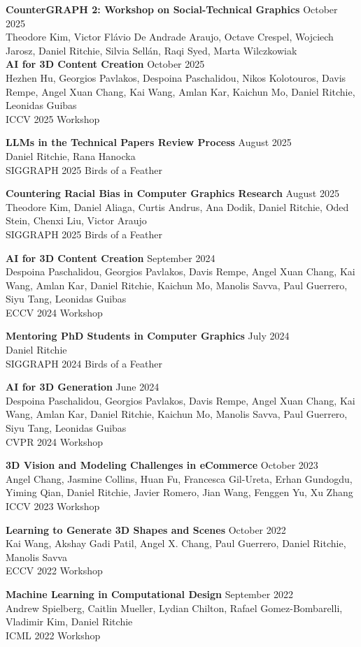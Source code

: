 \documentclass[line,margin]{res}
\begin{document}
\begin{resume}
\newcommand{\tutorial}[4] {
	\textbf{#1} \hfill #4\\
	#2\\
	#3
}
\newcommand{\workshop}[4] {
	\textbf{#1} \hfill #4\\
	#2\\
	#3
}

\workshop
{CounterGRAPH 2: Workshop on Social-Technical Graphics}
{Theodore Kim, Victor Flávio De Andrade Araujo, Octave Crespel, Wojciech Jarosz, Daniel Ritchie, Silvia Sellán, Raqi Syed, Marta Wilczkowiak}
{}
{October 2025}

\workshop
{AI for 3D Content Creation}
{Hezhen Hu, Georgios Pavlakos, Despoina Paschalidou, Nikos Kolotouros, Davis Rempe, Angel Xuan Chang, Kai Wang, Amlan Kar, Kaichun Mo, Daniel Ritchie, Leonidas Guibas}
{ICCV 2025 Workshop}
{October 2025}

\workshop
{LLMs in the Technical Papers Review Process}
{Daniel Ritchie, Rana Hanocka}
{SIGGRAPH 2025 Birds of a Feather}
{August 2025}

\workshop
{Countering Racial Bias in Computer Graphics Research}
{Theodore Kim, Daniel Aliaga, Curtis Andrus, Ana Dodik, Daniel Ritchie, Oded Stein, Chenxi Liu, Victor Araujo}
{SIGGRAPH 2025 Birds of a Feather}
{August 2025}

\workshop
{AI for 3D Content Creation}
{Despoina Paschalidou, Georgios Pavlakos, Davis Rempe, Angel Xuan Chang, Kai Wang, Amlan Kar, Daniel Ritchie, Kaichun Mo, Manolis Savva, Paul Guerrero, Siyu Tang, Leonidas Guibas}
{ECCV 2024 Workshop}
{September 2024}

\workshop
{Mentoring PhD Students in Computer Graphics}
{Daniel Ritchie}
{SIGGRAPH 2024 Birds of a Feather}
{July 2024}

\workshop
{AI for 3D Generation}
{Despoina Paschalidou, Georgios Pavlakos, Davis Rempe, Angel Xuan Chang, Kai Wang, Amlan Kar, Daniel Ritchie, Kaichun Mo, Manolis Savva, Paul Guerrero, Siyu Tang, Leonidas Guibas}
{CVPR 2024 Workshop}
{June 2024}

\workshop
{3D Vision and Modeling Challenges in eCommerce}
{Angel Chang, Jasmine Collins, Huan Fu, Francesca Gil-Ureta, Erhan Gundogdu, Yiming Qian, Daniel Ritchie, Javier Romero, Jian Wang, Fenggen Yu, Xu Zhang}
{ICCV 2023 Workshop}
{October 2023}

\workshop
{Learning to Generate 3D Shapes and Scenes}
{Kai Wang, Akshay Gadi Patil, Angel X. Chang, Paul Guerrero, Daniel Ritchie, Manolis Savva}
{ECCV 2022 Workshop}
{October 2022}

\workshop
{Machine Learning in Computational Design}
{Andrew Spielberg, Caitlin Mueller, Lydian Chilton, Rafael Gomez-Bombarelli, Vladimir Kim, Daniel Ritchie}
{ICML 2022 Workshop}
{September 2022}


\end{resume}
\end{document}

